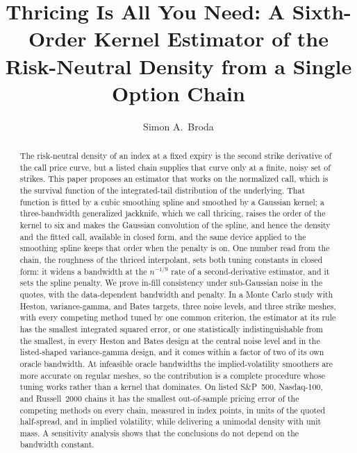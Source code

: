 \documentclass[preprint,12pt,authoryear,times]{elsarticle}
\begin{document}
\begin{frontmatter}

\title{Thricing Is All You Need: A Sixth-Order Kernel Estimator of the Risk-Neutral Density from a Single Option Chain}

\author[ifz]{Simon A.\ Broda}

\begin{abstract}
The risk-neutral density of an index at a fixed expiry is the second strike derivative of the call price curve, but a listed chain supplies that curve only at a finite, noisy set of strikes. This paper proposes an estimator that works on the normalized call, which is the survival function of the integrated-tail distribution of the underlying. That function is fitted by a cubic smoothing spline and smoothed by a Gaussian kernel; a three-bandwidth generalized jackknife, which we call thricing, raises the order of the kernel to six and makes the Gaussian convolution of the spline, and hence the density and the fitted call, available in closed form, and the same device applied to the smoothing spline keeps that order when the penalty is on. One number read from the chain, the roughness of the thriced interpolant, sets both tuning constants in closed form: it widens a bandwidth at the \(n^{-1/9}\) rate of a second-derivative estimator, and it sets the spline penalty. We prove in-fill consistency under sub-Gaussian noise in the quotes, with the data-dependent bandwidth and penalty. In a Monte Carlo study with Heston, variance-gamma, and Bates targets, three noise levels, and three strike meshes, with every competing method tuned by one common criterion, the estimator at its rule has the smallest integrated squared error, or one statistically indistinguishable from the smallest, in every Heston and Bates design at the central noise level and in the listed-shaped variance-gamma design, and it comes within a factor of two of its own oracle bandwidth. At infeasible oracle bandwidths the implied-volatility smoothers are more accurate on regular meshes, so the contribution is a complete procedure whose tuning works rather than a kernel that dominates. On listed S\&P~500, Nasdaq-100, and Russell~2000 chains it has the smallest out-of-sample pricing error of the competing methods on every chain, measured in index points, in units of the quoted half-spread, and in implied volatility, while delivering a unimodal density with unit mass. A sensitivity analysis shows that the conclusions do not depend on the bandwidth constant.
\end{abstract}


\end{frontmatter}
\end{document}

